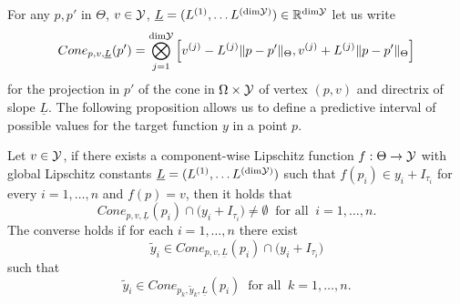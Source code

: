 For any $p,p'$ in $\Theta$, $v\in \mathcal Y$, $\underline{L} = (L^{(1)},\dots L^{(\text{dim}\mathcal Y)} ) \in \mathbb{R}^{\text{dim} \mathcal Y}$ let us write 
\[
        Cone_{p,v,\underline L}(p') = \bigotimes_{j=1}^{\text{dim} \mathcal Y} \left[ v^{(j)} - L^{(j)} \|p-p'\|_\Theta, v^{(j)} + L^{(j)} \|p-p'\|_\Theta \right]
\]
for the projection in $p'$ of the cone in $\Omega \times \mathcal Y$ of vertex $(p,v)$ and directrix of slope $\underline L$.
The following proposition allows us to define a predictive interval of possible values for the target function $y$ in a point $p$.

\begin{prp}\label{prp:lips}
    Let $v \in \mathcal Y$, if there exists a component-wise Lipschitz function $f: \Theta \rightarrow \mathcal Y$ with global Lipschitz constants $\underline L = (L^{(1)},\dots L^{(\text{dim}\mathcal Y)} )$ such that $f(p_i) \in y_i + I_{\tau_i}$ for every $i = 1, \dots, n$ and $f(p) = v$, then it holds that
        \begin{equation} \label{eq:lips-cond1}
            Cone_{p,v,\underline L}(p_i) \cap  \big ( y_i + I_{\tau_i} \big ) \neq \emptyset \ \text{ for all } \ i = 1, \dots, n .         
        \end{equation}
    The converse holds if for each $i = 1, \dots, n$ there exist 
    \begin{equation} \label{eq:lips-cond1.2}
        \tilde y_i \in Cone_{p,v,\underline L}(p_i) \cap  \big ( y_i + I_{\tau_i} \big )
    \end{equation}
    such that
    \begin{equation} \label{eq:lips-cond2}
        \tilde y_i \in  Cone_{p_k,\tilde y_k,\underline L}(p_i) \ \text{ for all } \ k = 1, \dots, n.
    \end{equation}
\end{prp}
